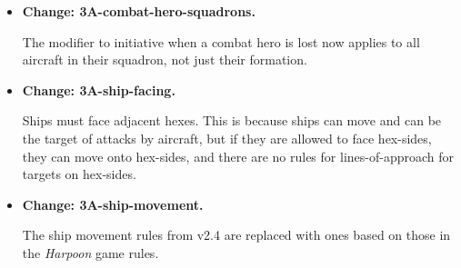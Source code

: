 \documentclass{report}
\newcommand{\changetag}[1]{\textbf{Change: #1.}\par}
\begin{document}
\begin{itemize}
        The IRM attack modifier for ground clutter applies if the target is in the LO altitude band and the missile's flight slope since launch or climbing is less than .

    \item\changetag{3A-combat-hero-squadrons}

        The  modifier to initiative when a combat hero is lost now applies to all aircraft in their squadron, not just their formation.

    \item\changetag{3A-ship-facing}

        Ships must face adjacent hexes. This is because ships can move and can be the target of attacks by aircraft, but if they are allowed to face hex-sides, they can move onto hex-sides, and there are no rules for lines-of-approach for targets on hex-sides.

    \item\changetag{3A-ship-movement}

        The ship movement rules from v2.4 are replaced with ones based on those in the \emph{Harpoon} game rules.









\end{itemize}
\end{document}

